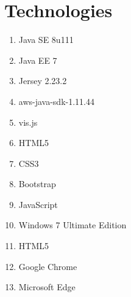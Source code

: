 \documentclass[hidelinks,a4paper,12pt]{article}
\begin{document}
\newpage
\section{Technologies} 
\begin{enumerate} 
\item Java SE 8u111
\item Java EE 7
\item Jersey 2.23.2 
\item aws-java-sdk-1.11.44
\item vis.js
\item HTML5
\item CSS3
\item Bootstrap
\item JavaScript
\item Windows 7 Ultimate Edition
\item HTML5
\item Google Chrome
\item Microsoft Edge
\end{enumerate}
\end{document}
